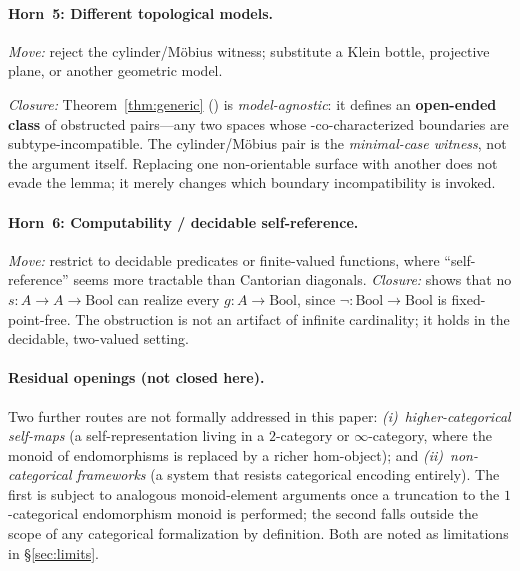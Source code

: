 \documentclass[11pt]{article}
\begin{document}
\paragraph{Horn~5: Different topological models.}
\emph{Move:} reject the cylinder/M\"obius witness; substitute a
Klein bottle, projective plane, or another geometric model.

\emph{Closure:} Theorem~\ref{thm:generic}\newline
()\newline
\noindent is \emph{model-agnostic}: it defines an
\textbf{open-ended class} of obstructed pairs---any two spaces
whose -co-characterized boundaries are
subtype-incompatible.  The cylinder/M\"obius pair is the
\emph{minimal-case witness}, not the argument itself.  Replacing
one non-orientable surface with another does not evade the
lemma; it merely changes which boundary incompatibility is
invoked.

\paragraph{Horn~6: Computability / decidable self-reference.}
\emph{Move:} restrict to decidable predicates or finite-valued functions,
where ``self-reference'' seems more tractable than Cantorian diagonals.
\emph{Closure:}
shows that no $s : A \to A \to \mathrm{Bool}$ can realize every
$g : A \to \mathrm{Bool}$, since $\lnot : \mathrm{Bool} \to \mathrm{Bool}$
is fixed-point-free.  The obstruction is not an artifact of infinite
cardinality; it holds in the decidable, two-valued setting.

\paragraph{Residual openings (not closed here).}
Two further routes are not formally addressed in this paper:
\emph{(i)}~\emph{higher-categorical self-maps} (a self-representation
living in a $2$-category or $\infty$-category, where the monoid of
endomorphisms is replaced by a richer hom-object); and
\emph{(ii)}~\emph{non-categorical frameworks} (a system that resists
categorical encoding entirely).  The first is subject to analogous
monoid-element arguments once a truncation to the $1$-categorical
endomorphism monoid is performed; the second falls outside the scope of
any categorical formalization by definition.  Both are noted as
limitations in \S\ref{sec:limits}.
\end{document}
